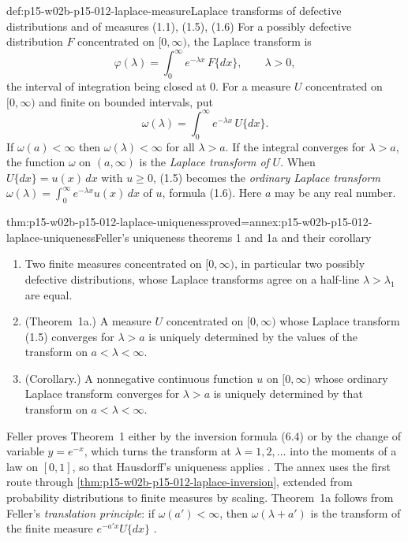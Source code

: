 \begin{hbdefinition}{def:p15-w02b-p15-012-laplace-measure}{Laplace transforms of defective distributions and of measures (1.1), (1.5), (1.6)}
For a possibly defective distribution \(F\) concentrated on \([0,\infty)\),
the Laplace transform is
\[
 \varphi(\lambda)=\int_0^\infty e^{-\lambda x}\,F\{dx\},\qquad\lambda>0,
 \tag{1.1}
\]
the interval of integration being closed at \(0\). For a measure \(U\)
concentrated on \([0,\infty)\) and finite on bounded intervals, put
\[
 \omega(\lambda)=\int_0^\infty e^{-\lambda x}\,U\{dx\}.
 \tag{1.5}
\]
If \(\omega(a)<\infty\) then \(\omega(\lambda)<\infty\) for all \(\lambda>a\).
If the integral converges for \(\lambda>a\), the function \(\omega\) on
\((a,\infty)\) is the \emph{Laplace transform of} \(U\). When
\(U\{dx\}=u(x)\,dx\) with \(u\geq0\), (1.5) becomes the \emph{ordinary
Laplace transform} \(\omega(\lambda)=\int_0^\infty e^{-\lambda x}u(x)\,dx\)
of \(u\), formula (1.6). Here \(a\) may be any real number.
\end{hbdefinition}

\begin{hbtheorem}{thm:p15-w02b-p15-012-laplace-uniqueness}{proved=annex:p15-w02b-p15-012-laplace-uniqueness}{Feller's uniqueness theorems 1 and 1a and their corollary}
\begin{enumerate}
\item Two finite measures concentrated on \([0,\infty)\), in particular two
      possibly defective distributions, whose Laplace transforms agree on a
      half-line \(\lambda>\lambda_1\) are equal.
\item (Theorem~1a.) A measure \(U\) concentrated on \([0,\infty)\) whose
      Laplace transform (1.5) converges for \(\lambda>a\) is uniquely
      determined by the values of the transform on \(a<\lambda<\infty\).
\item (Corollary.) A nonnegative continuous function \(u\) on \([0,\infty)\)
      whose ordinary Laplace transform converges for \(\lambda>a\) is
      uniquely determined by that transform on \(a<\lambda<\infty\).
\end{enumerate}
\end{hbtheorem}

Feller proves Theorem~1 either by the inversion formula (6.4) or by the change
of variable \(y=e^{-x}\), which turns the transform at \(\lambda=1,2,\ldots\)
into the moments of a law on \([0,1]\), so that Hausdorff's uniqueness applies
\cite[vol.~II, XIII.1, p.~430]{Feller1971ProbabilityII}. The annex uses the
first route through \cref{thm:p15-w02b-p15-012-laplace-inversion}, extended
from probability distributions to finite measures by scaling. Theorem~1a
follows from Feller's \emph{translation principle}: if \(\omega(a')<\infty\),
then \(\omega(\lambda+a')\) is the transform of the finite measure
\(e^{-a'x}U\{dx\}\) \cite[vol.~II, XIII.1, (1.9), p.~432]{Feller1971ProbabilityII}.

